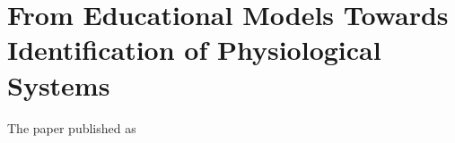 \chapter{From Educational Models Towards Identification of Physiological Systems}\label{app:fromeducational}
The paper \cite{Kulhanek2011} published as
 

%

